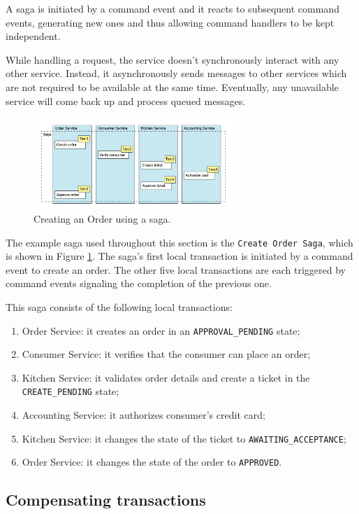\documentclass[conference]{IEEEtran}
\begin{document}
A saga is initiated by a command event and it reacts to subsequent command events, generating new ones and thus allowing command handlers to be kept independent.

While handling a request, the service doesn’t synchronously interact with any other service. Instead, it asynchronously sends messages to other services which are not required to be available at the same time. Eventually, any unavailable service will come back up and process queued messages.

\begin{figure}[!htbp]
\centering
\includegraphics[width=3in]{jpeg/order-saga}
\caption{Creating an Order using a saga. \cite{microservices-patterns-saga}}
\label{order_saga}
\end{figure}

The example saga used throughout this section is the \texttt{Create Order Saga}, which is shown in Figure \ref{order_saga}. The saga’s first local transaction is initiated by a command event to create an order. The other five local transactions are each triggered by command events signaling the completion of the previous one.

This saga consists of the following local transactions:

\begin{enumerate}
  \item Order Service: it creates an order in an \texttt{APPROVAL\_PENDING} state;
  \item Consumer Service: it verifies that the consumer can place an order;
  \item Kitchen Service: it validates order details and create a ticket in the \texttt{CREATE\_PENDING} state;
  \item Accounting Service: it authorizes consumer’s credit card;
  \item Kitchen Service: it changes the state of the ticket to \texttt{AWAITING\_ACCEPTANCE};
  \item Order Service: it changes the state of the order to \texttt{APPROVED}.
\end{enumerate}

\subsection{Compensating transactions}
\end{document}
